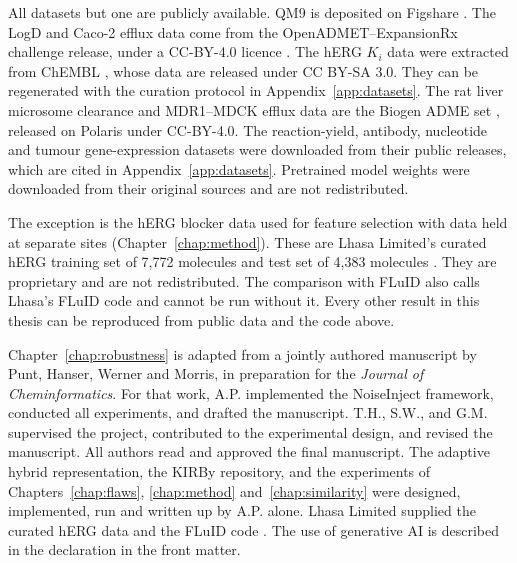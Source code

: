 All datasets but one are publicly available. QM9 \citep{Ramakrishnan2014} is deposited on Figshare \citep{qm9_dataset}. The LogD and Caco-2 efflux data come from the OpenADMET--ExpansionRx challenge release, under a CC-BY-4.0 licence \citep{openadmet}. The hERG $K_i$ data were extracted from ChEMBL \citep{Zdrazil2023}, whose data are released under CC BY-SA 3.0. They can be regenerated with the curation protocol in Appendix~\ref{app:datasets}. The rat liver microsome clearance and MDR1--MDCK efflux data are the Biogen ADME set \citep{fang2023}, released on Polaris \citep{polaris} under CC-BY-4.0. The reaction-yield, antibody, nucleotide and tumour gene-expression datasets were downloaded from their public releases, which are cited in Appendix~\ref{app:datasets}. Pretrained model weights were downloaded from their original sources and are not redistributed.

The exception is the hERG blocker data used for feature selection with data held at separate sites (Chapter~\ref{chap:method}). These are Lhasa Limited's curated hERG training set of 7,772 molecules and test set of 4,383 molecules \citep{Hanser2025}. They are proprietary and are not redistributed. The comparison with FLuID also calls Lhasa's FLuID code and cannot be run without it. Every other result in this thesis can be reproduced from public data and the code above.

Chapter~\ref{chap:robustness} is adapted from a jointly authored manuscript by Punt, Hanser, Werner and Morris, in preparation for the \textit{Journal of Cheminformatics}. For that work, A.P. implemented the NoiseInject framework, conducted all experiments, and drafted the manuscript. T.H., S.W., and G.M. supervised the project, contributed to the experimental design, and revised the manuscript. All authors read and approved the final manuscript. The adaptive hybrid representation, the KIRBy repository, and the experiments of Chapters~\ref{chap:flaws}, \ref{chap:method} and~\ref{chap:similarity} were designed, implemented, run and written up by A.P. alone. Lhasa Limited supplied the curated hERG data and the FLuID code \citep{Hanser2025}. The use of generative AI is described in the declaration in the front matter.
